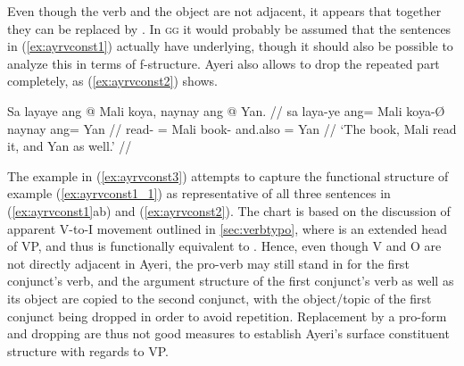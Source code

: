 \xe

Even though the verb and the object are not adjacent, it appears that together
they can be replaced by . In \textsc{gg}
it would probably be assumed that the sentences in (\ref{ex:ayrvconst1})
actually have 
underlying, though it should also be possible to analyze this in terms of
f-structure. Ayeri also allows to drop the repeated part completely, as
(\ref{ex:ayrvconst2}) shows.

\ex\label{ex:ayrvconst2}\begingl
	\gla Sa layaye ang @ Mali koya, naynay ang @ Yan. //
	\glb sa laya-ye ang= Mali koya-Ø naynay ang= Yan //
	\glc \PatT{} read-\TsgF{} \Aarg{}= Mali book-\Top{} and.also \Aarg{}= 
		Yan //
	\glft `The book, Mali read it, and Yan as well.' //
\endgl
\xe

The example in (\ref{ex:ayrvconst3}) attempts to capture the functional
structure of example (\ref{ex:ayrvconst1_1}) as representative of all three
sentences in (\ref{ex:ayrvconst1}ab) and (\ref{ex:ayrvconst2}). The chart is
based on the discussion of apparent V-to-I movement outlined in
\autoref{sec:verbtypo}, where  is an extended head of VP, and thus is
functionally equivalent to . Hence, even though V and O are not
directly adjacent in Ayeri, the pro-verb  may still stand
in for the first conjunct's verb, and the argument structure of the first
conjunct's verb as well as its object are copied to the second conjunct, with
the object/topic of the first conjunct being dropped in order to avoid
repetition. Replacement by a pro-form and dropping are thus not good measures
to establish Ayeri's surface constituent structure with regards to VP.

